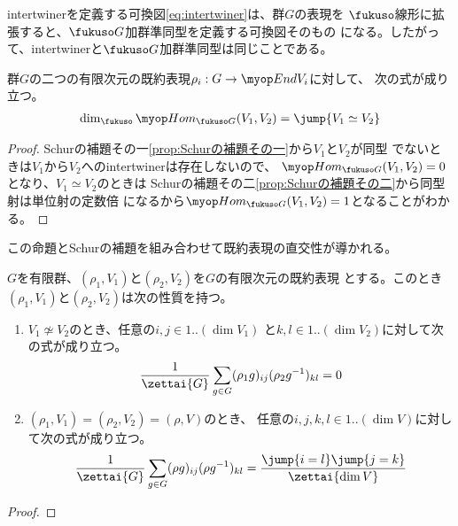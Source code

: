 	intertwinerを定義する可換図\eqref{eq:intertwiner}は、群$G$の表現を
	$\fukuso$線形に拡張すると、$\fukuso G$加群準同型を定義する可換図そのもの
	になる。したがって、intertwinerと$\fukuso G$加群準同型は同じことである。

	\begin{proposition}[Schurの補題の言い換え]\label{prop:Schurの補題の言い換え} %
		群$G$の二つの有限次元の既約表現$\rho_i:G\to \End V_i$に対して、
		次の式が成り立つ。
		\begin{equation*}\begin{split} %
			\dim_\fukuso\Hom_{\fukuso G}(V_1,V_2) = \jump{V_1\simeq V_2}
		\end{split}\end{equation*} %
	\end{proposition} %
	\begin{proof} %
		Schurの補題その一\ref{prop:Schurの補題その一}から$V_1$と$V_2$が同型
		でないときは$V_1$から$V_2$へのintertwinerは存在しないので、
		$\Hom_{\fukuso G}(V_1,V_2)=0$となり、$V_1\simeq V_2$のときは
		Schurの補題その二\ref{prop:Schurの補題その二}から同型射は単位射の定数倍
		になるから$\Hom_{\fukuso G}(V_1,V_2)=1$となることがわかる。
	\end{proof} %


	この命題とSchurの補題を組み合わせて既約表現の直交性が導かれる。

	\begin{proposition}[既約表現の直交性]\label{prop:既約表現の直交性} %
		$G$を有限群、$(\rho_1,V_1)$と$(\rho_2,V_2)$を$G$の有限次元の既約表現
		とする。このとき$(\rho_1,V_1)$と$(\rho_2,V_2)$は次の性質を持つ。
		\begin{enumerate}\setlength{\itemsep}{-1mm} %
			\item $V_1\not\simeq V_2$のとき、任意の$i,j\in1..(\dim V_1)$
			と$k,l\in1..(\dim V_2)$に対して次の式が成り立つ。
			\begin{equation*}\begin{split} %
				\frac{1}{\zettai{G}}\sum_{g\in G}(\rho_1g)_{ij}(\rho_2g^{-1})_{kl}
				= 0
			\end{split}\end{equation*} %
			\item $(\rho_1,V_1)=(\rho_2,V_2)=(\rho,V)$のとき、
			任意の$i,j,k,l\in1..(\dim V)$に対して次の式が成り立つ。
			\begin{equation*}\begin{split} %
				\frac{1}{\zettai{G}}\sum_{g\in G}(\rho g)_{ij}(\rho g^{-1})_{kl}
				= \frac{\jump{i=l}\jump{j=k}}{\zettai{\dim V}}
			\end{split}\end{equation*} %
		\end{enumerate} %
	\end{proposition} %
	\begin{proof} %
	\end{proof} %

